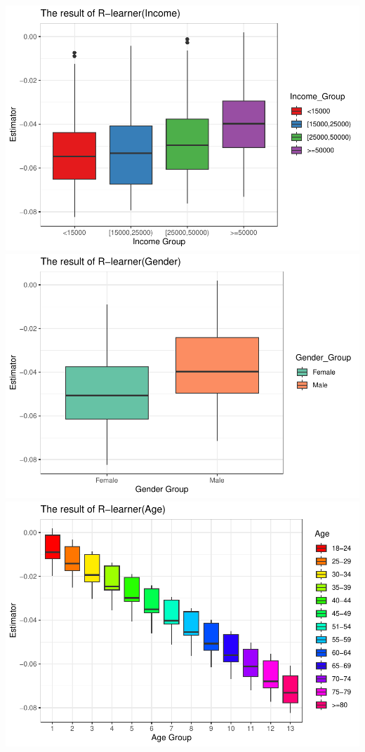 \documentclass[
  12pt,
]{article}
\begin{document}
\includegraphics{template_files/figure-latex/unnamed-chunk-7-1.pdf}
\includegraphics{template_files/figure-latex/unnamed-chunk-7-2.pdf}
\includegraphics{template_files/figure-latex/unnamed-chunk-7-3.pdf}
\end{document}
